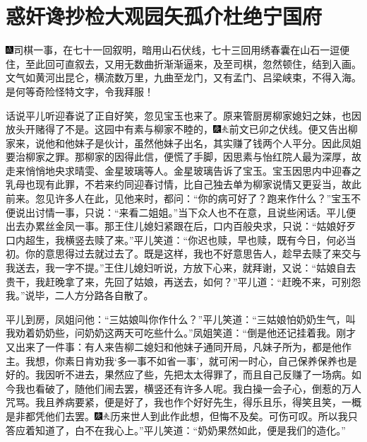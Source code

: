 \chapter{惑奸谗抄检大观园\hspace{.5em}矢孤介杜绝宁国府}
{\includegraphics[width=3mm]{../Images/00005}\kaishu 司棋一事，在七十一回叙明，暗用山石伏线，七十三回用绣春囊在山石一逗便住，至此回可直叙去，又用无数曲折渐渐逼来，及至司棋，忽然顿住，结到入画。文气如黄河出昆仑，横流数万里，九曲至龙门，又有孟门、吕梁峡束，不得入海。是何等奇险怪特文字，令我拜服！}

话说平儿听迎春说了正自好笑，忽见宝玉也来了。原来管厨房柳家媳妇之妹，也因放头开赌得了不是。这园中有素与柳家不睦的，{\includegraphics[width=3mm]{../Images/00004}\includegraphics[width=3mm]{../Images/00012}\footnotesize \kaishu 前文已卯之伏线。}便又告出柳家来，说他和他妹子是伙计，虽然他妹子出名，其实赚了钱两个人平分。因此凤姐要治柳家之罪。那柳家的因得此信，便慌了手脚，因思素与怡红院人最为深厚，故走来悄悄地央求晴雯、金星玻璃等人。金星玻璃告诉了宝玉。宝玉因思内中迎春之乳母也现有此罪，不若来约同迎春讨情，比自己独去单为柳家说情又更妥当，故此前来。忽见许多人在此，见他来时，都问：``你的病可好了？跑来作什么？''宝玉不便说出讨情一事，只说：``来看二姐姐。''当下众人也不在意，且说些闲话。平儿便出去办累丝金凤一事。那王住儿媳妇紧跟在后，口内百般央求，只说：``姑娘好歹口内超生，我横竖去赎了来。''平儿笑道：``你迟也赎，早也赎，既有今日，何必当初。你的意思得过去就过去了。既是这样，我也不好意思告人，趁早去赎了来交与我送去，我一字不提。''王住儿媳妇听说，方放下心来，就拜谢，又说：``姑娘自去贵干，我赶晚拿了来，先回了姑娘，再送去，如何？''平儿道：``赶晚不来，可别怨我。''说毕，二人方分路各自散了。

平儿到房，凤姐问他：``三姑娘叫你作什么？''平儿笑道：``三姑娘怕奶奶生气，叫我劝着奶奶些，问奶奶这两天可吃些什么。''凤姐笑道：``倒是他还记挂着我。刚才又出来了一件事：有人来告柳二媳妇和他妹子通同开局，凡妹子所为，都是他作主。我想，你素日肯劝我`多一事不如省一事'，就可闲一时心，自己保养保养也是好的。我因听不进去，果然应了些，先把太太得罪了，而且自己反赚了一场病。如今我也看破了，随他们闹去罢，横竖还有许多人呢。我白操一会子心，倒惹的万人咒骂。我且养病要紧，便是好了，我也作个好好先生，得乐且乐，得笑且笑，一概是非都凭他们去罢。{\includegraphics[width=3mm]{../Images/00004}\includegraphics[width=3mm]{../Images/00012}\footnotesize \kaishu 历来世人到此作此想，但悔不及矣。可伤可叹。}所以我只答应着知道了，白不在我心上。''平儿笑道：``奶奶果然如此，便是我们的造化。''

